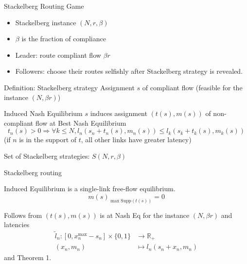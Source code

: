 \documentclass[xcolor=svgnames, english, smaller]{beamer}
\theoremstyle{plain}
\theoremstyle{definition}
\theoremstyle{plain}
\theoremstyle{plain}
\begin{document}
\begin{frame}{Stackelberg Routing Game}

\begin{itemize}
\item Stackelberg instance $(N, r, \beta)$
\item $\beta$ is the fraction of compliance
\item Leader: route compliant flow $\beta r$
\item Followers: choose their routes selfishly after Stackelberg strategy is revealed.
\end{itemize}


\begin{block}{Definition: Stackelberg strategy}
Assignment $s$ of compliant flow (feasible for the instance $(N,\beta r)$)
\end{block}

\begin{block}{Induced Nash Equilibrium}
$s$ induces assignment $(t(s), m(s))$ of non-compliant flow at Best Nash Equilibrium
\[
t_n(s)>0 \Rightarrow \forall k \leq N, l_n(s_n + t_n(s), m_n(s)) \leq l_k(s_k + t_k(s), m_k(s))
\]
(if $n$ is in the support of $t$, all other links have greater latency)
\end{block}

Set of Stackelberg strategies: $S(N, r, \beta)$

\end{frame}


\begin{frame}{Stackelberg routing}

\begin{lemma}
Induced Equilibrium is a single-link free-flow equilibrium.
\[
m(s)_{\max \text{Supp}(t(s))} = 0
\]
\end{lemma}

Follows from $(t(s), m(s))$ is at Nash Eq for the instance $(N,\beta r)$ and latencies
\begin{align*}
\tilde{l}_n: [0, x_n^{\max} - s_n]\times \{0,1\} & \rightarrow \mathbb{R}_+\\
(x_n,m_n) & \mapsto l_n(s_n+x_n,m_n)
\end{align*}
and Theorem 1.

\end{frame}
\end{document}
